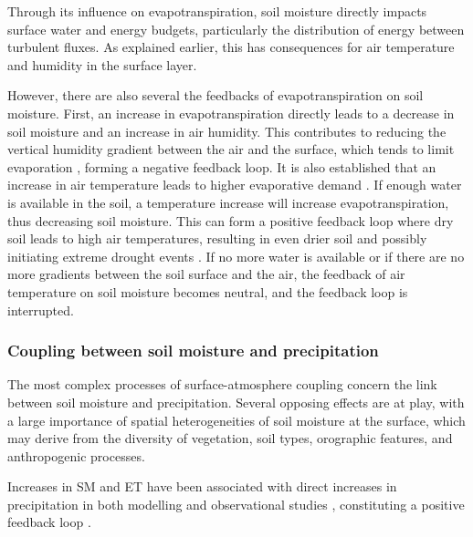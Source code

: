 Through its influence on evapotranspiration, soil moisture directly impacts surface water and energy budgets, particularly the distribution of energy between turbulent fluxes. As explained earlier, this has consequences for air temperature and humidity in the surface layer.

However, there are also several the feedbacks of evapotranspiration on soil moisture. First, an increase in evapotranspiration directly leads to a decrease in soil moisture and an increase in air humidity. This contributes to reducing the vertical humidity gradient between the air and the surface, which tends to limit evaporation \citep{allen_crop_2000}, forming a negative feedback loop. It is also established that an increase in air temperature leads to higher evaporative demand \citep{jarvis_stomatal_1986}. If enough water is available in the soil, a temperature increase will increase evapotranspiration, thus decreasing soil moisture. This can form a positive feedback loop where dry soil leads to high air temperatures, resulting in even drier soil and possibly initiating extreme drought events \citep{quesada_asymmetric_2012}. If no more water is available or if there are no more gradients between the soil surface and the air, the feedback of air temperature on soil moisture becomes neutral, and the feedback loop is interrupted.

\subsubsection*{Coupling between soil moisture and precipitation}

The most complex processes of surface-atmosphere coupling concern the link between soil moisture and precipitation. Several opposing effects are at play, with a large importance of spatial heterogeneities of soil moisture at the surface, which may derive from the diversity of vegetation, soil types, orographic features, and anthropogenic processes.

Increases in SM and ET have been associated with direct increases in precipitation in both modelling and observational studies \citep{koster_observational_2003, guo_glace_2006, wei_dissecting_2012, findell_probability_2011}, constituting a positive feedback loop \citep[moisture recycling, as presented in ][]{eltahir_precipitation_1996}.

